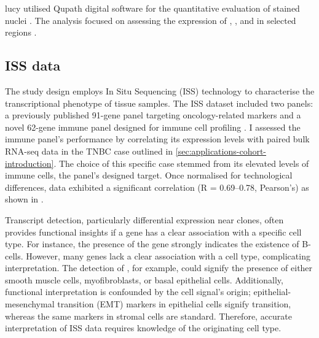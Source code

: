 \ac{lucy} utilised Qupath digital software for the quantitative evaluation of stained nuclei \parencite{Bankhead2017-px}. The analysis focused on assessing the expression of , , and  in selected regions .

\subsection{\acl{ISS} data}
\label{sec:modalities-iss}


The study design employs In Situ Sequencing (\ac{ISS}) technology to characterise the transcriptional phenotype of tissue samples. The \ac{ISS} dataset included two panels: a previously published 91-gene panel targeting oncology-related markers and a novel 62-gene immune panel designed for immune cell profiling . I assessed the immune panel's performance by correlating its expression levels with paired bulk RNA-seq data in the \acf{TNBC} case outlined in \cref{sec:applications-cohort-introduction}. The choice of this specific case stemmed from its elevated levels of immune cells, the panel's designed target. Once normalised for technological differences, data exhibited a significant correlation (R = 0.69–0.78, Pearson's) as shown in .

Transcript detection, particularly differential expression near clones, often provides functional insights if a gene has a clear association with a specific cell type. For instance, the presence of the  gene strongly indicates the existence of B-cells. However, many genes lack a clear association with a cell type, complicating interpretation. The detection of , for example, could signify the presence of either smooth muscle cells, myofibroblasts, or basal epithelial cells. Additionally, functional interpretation is confounded by the cell signal's origin; epithelial-mesenchymal transition (EMT) markers in epithelial cells signify transition, whereas the same markers in stromal cells are standard. Therefore, accurate interpretation of \ac{ISS} data requires knowledge of the originating cell type.

